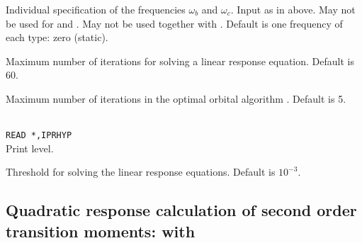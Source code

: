 \begin{description}
\item[, ]
Individual specification of the frequencies $\omega_b$ and $\omega_c$.
Input as in  above.
May not be used for  and .
May not be used together with .
Default is one frequency of each type: zero (static).

\item{}
Maximum number of iterations for solving a linear response equation.
Default is 60.

\item{}
Maximum number of iterations in the optimal
orbital algorithm 
\cite{tuhjahjajpjjcp84}. 
Default is 5.

\item{}\\
\verb|READ *,IPRHYP|\\
Print level.

\item{}
Threshold for solving the linear response equations.
Default is $10^{-3}$.

\end{description}

\subsection{Quadratic response calculation of second order transition moments:
 with }


